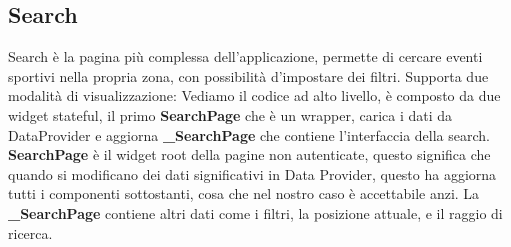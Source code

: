 \documentclass[a4paper,12pt]{article}
\begin{document}
\begin{figure}[H]
\begin{minipage}{0.40\textwidth}
    \end{minipage}
\end{figure}



\subsection{Search}
\label{sec:search}

Search è la pagina più complessa dell'applicazione, permette di cercare eventi sportivi nella propria zona, con possibilità d'impostare dei filtri. Supporta due modalità di visualizzazione: Vediamo il codice ad alto livello, è composto da due widget stateful, il primo \textbf{SearchPage} che è un wrapper, carica i dati da DataProvider e aggiorna \textbf{\_SearchPage} che contiene l'interfaccia della search.
\textbf{SearchPage} è il widget root della pagine non autenticate, questo significa che quando si modificano dei dati significativi in Data Provider, questo ha aggiorna tutti i componenti sottostanti, cosa che nel nostro caso è accettabile anzi.
La \textbf{\_SearchPage} contiene altri dati come i filtri, la posizione attuale, e il raggio di ricerca.
\end{document}
